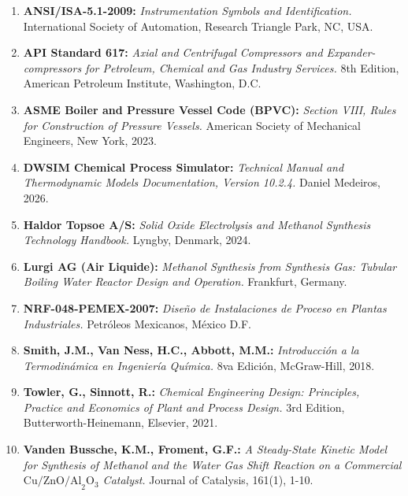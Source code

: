 \documentclass[10pt,letterpaper]{article}
\begin{document}
\begin{enumerate}[leftmargin=*,itemsep=4pt]
    \item \textbf{ANSI/ISA-5.1-2009:} \textit{Instrumentation Symbols and Identification.} International Society of Automation, Research Triangle Park, NC, USA.
    \item \textbf{API Standard 617:} \textit{Axial and Centrifugal Compressors and Expander-compressors for Petroleum, Chemical and Gas Industry Services.} 8th Edition, American Petroleum Institute, Washington, D.C.
    \item \textbf{ASME Boiler and Pressure Vessel Code (BPVC):} \textit{Section VIII, Rules for Construction of Pressure Vessels.} American Society of Mechanical Engineers, New York, 2023.
    \item \textbf{DWSIM Chemical Process Simulator:} \textit{Technical Manual and Thermodynamic Models Documentation, Version 10.2.4.} Daniel Medeiros, 2026.
    \item \textbf{Haldor Topsoe A/S:} \textit{Solid Oxide Electrolysis and Methanol Synthesis Technology Handbook.} Lyngby, Denmark, 2024.
    \item \textbf{Lurgi AG (Air Liquide):} \textit{Methanol Synthesis from Synthesis Gas: Tubular Boiling Water Reactor Design and Operation.} Frankfurt, Germany.
    \item \textbf{NRF-048-PEMEX-2007:} \textit{Diseño de Instalaciones de Proceso en Plantas Industriales.} Petróleos Mexicanos, México D.F.
    \item \textbf{Smith, J.M., Van Ness, H.C., Abbott, M.M.:} \textit{Introducción a la Termodinámica en Ingeniería Química.} 8va Edición, McGraw-Hill, 2018.
    \item \textbf{Towler, G., Sinnott, R.:} \textit{Chemical Engineering Design: Principles, Practice and Economics of Plant and Process Design.} 3rd Edition, Butterworth-Heinemann, Elsevier, 2021.
    \item \textbf{Vanden Bussche, K.M., Froment, G.F.:} \textit{A Steady-State Kinetic Model for Synthesis of Methanol and the Water Gas Shift Reaction on a Commercial $\text{Cu/ZnO/Al}_2\text{O}_3$ Catalyst.} Journal of Catalysis, 161(1), 1-10.
\end{enumerate}

\vspace{0.6cm}
\end{document}

